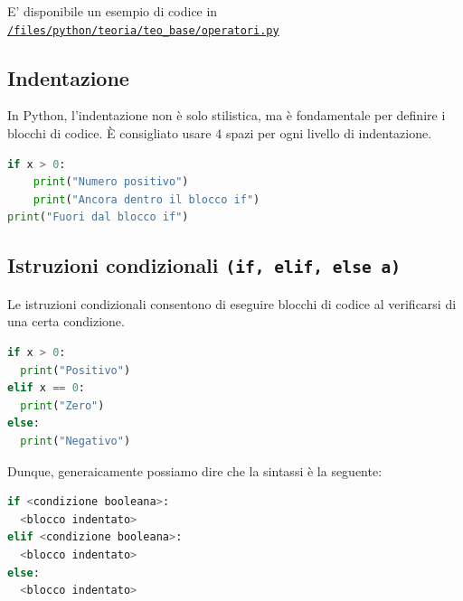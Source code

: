 E' disponibile un esempio di codice in \texttt{\href{run:./files/python/teoria/teo_base/}{/files/python/teoria/teo\_base/operatori.py}}

\subsection{Indentazione}
In Python, l’indentazione non è solo stilistica, ma è fondamentale per definire i blocchi di codice. È consigliato usare 4 spazi per ogni livello di indentazione.

\begin{lstlisting}[language = python, frame = none]
if x > 0:
    print("Numero positivo")
    print("Ancora dentro il blocco if")
print("Fuori dal blocco if")
\end{lstlisting}

\subsection{Istruzioni condizionali \texttt{(if, elif, else a)}} \label{sec:condizioni}
Le istruzioni condizionali consentono di eseguire blocchi di codice al verificarsi di una certa condizione.

\begin{lstlisting}[language = python, frame = none]
if x > 0:
  print("Positivo")
elif x == 0:
  print("Zero")
else:
  print("Negativo")
\end{lstlisting}

Dunque, generaicamente possiamo dire che la sintassi è la seguente:
\begin{lstlisting}[language = python, frame = none]
if <condizione booleana>:
  <blocco indentato>
elif <condizione booleana>:
  <blocco indentato>
else:
  <blocco indentato>
\end{lstlisting}

